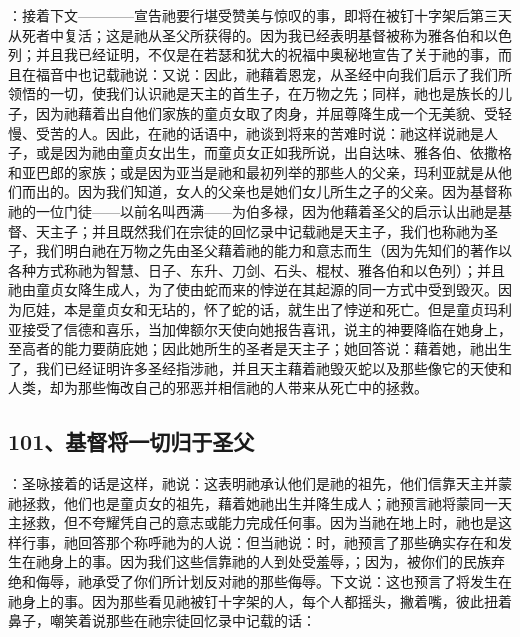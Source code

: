 ：接着下文————宣告祂要行堪受赞美与惊叹的事，即将在被钉十字架后第三天从死者中复活；这是祂从圣父所获得的。因为我已经表明基督被称为雅各伯和以色列；并且我已经证明，不仅是在若瑟和犹大的祝福中奥秘地宣告了关于祂的事，而且在福音中也记载祂说：又说：因此，祂藉着恩宠，从圣经中向我们启示了我们所领悟的一切，使我们认识祂是天主的首生子，在万物之先；同样，祂也是族长的儿子，因为祂藉着出自他们家族的童贞女取了肉身，并屈尊降生成一个无美貌、受轻慢、受苦的人。因此，在祂的话语中，祂谈到将来的苦难时说：祂这样说祂是人子，或是因为祂由童贞女出生，而童贞女正如我所说，出自达味、雅各伯、依撒格和亚巴郎的家族；或是因为亚当是祂和最初列举的那些人的父亲，玛利亚就是从他们而出的。因为我们知道，女人的父亲也是她们女儿所生之子的父亲。因为基督称祂的一位门徒——以前名叫西满——为伯多禄，因为他藉着圣父的启示认出祂是基督、天主子；并且既然我们在宗徒的回忆录中记载祂是天主子，我们也称祂为圣子，我们明白祂在万物之先由圣父藉着祂的能力和意志而生（因为先知们的著作以各种方式称祂为智慧、日子、东升、刀剑、石头、棍杖、雅各伯和以色列）；并且祂由童贞女降生成人，为了使由蛇而来的悖逆在其起源的同一方式中受到毁灭。因为厄娃，本是童贞女和无玷的，怀了蛇的话，就生出了悖逆和死亡。但是童贞玛利亚接受了信德和喜乐，当加俾额尔天使向她报告喜讯，说主的神要降临在她身上，至高者的能力要荫庇她；因此她所生的圣者是天主子；她回答说：藉着她，祂出生了，我们已经证明许多圣经指涉祂，并且天主藉着祂毁灭蛇以及那些像它的天使和人类，却为那些悔改自己的邪恶并相信祂的人带来从死亡中的拯救。\par


\subsection{101、基督将一切归于圣父}

：圣咏接着的话是这样，祂说：这表明祂承认他们是祂的祖先，他们信靠天主并蒙祂拯救，他们也是童贞女的祖先，藉着她祂出生并降生成人；祂预言祂将蒙同一天主拯救，但不夸耀凭自己的意志或能力完成任何事。因为当祂在地上时，祂也是这样行事，祂回答那个称呼祂为的人说：但当祂说：时，祂预言了那些确实存在和发生在祂身上的事。因为我们这些信靠祂的人到处受羞辱，；因为，被你们的民族弃绝和侮辱，祂承受了你们所计划反对祂的那些侮辱。下文说：这也预言了将发生在祂身上的事。因为那些看见祂被钉十字架的人，每个人都摇头，撇着嘴，彼此扭着鼻子，嘲笑着说那些在祂宗徒回忆录中记载的话：\par

